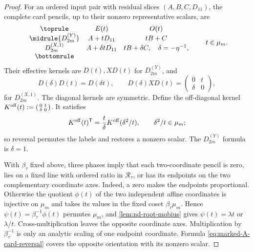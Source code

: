 \documentclass[11pt,letterpaper,onecolumn]{article}
\theoremstyle{plain}
\theoremstyle{definition}
\theoremstyle{remark}
\newcommand{\DihY}[1]{{D_{#1}^{(Y)}}}
\newcommand{\DihXone}[1]{{D_{#1}^{(X,1)}}}
\begin{document}
\begin{proof}
For an ordered input pair with residual slices \((A,B,C,D_{11})\), the complete
card pencils, up to their nonzero representative scalars, are
\begin{equation*}
\begin{array}{ccc}
\toprule
 &E(t)&O(t)\\ \midrule
 \DihY{2m}&A+tD_{11}&tB+C\\
 \DihXone{2m}&A+\delta tD_{11}&tB+\delta C,
 \quad \delta=-\eta^{-1},\\
\bottomrule
\end{array}
\qquad t\in\mu_m.
\end{equation*}
Their effective kernels are \(D(t),XD(t)\) for \(\DihY{2m}\), and
\[
 D(\delta)D(t)=D(\delta t),
 \qquad
 D(\delta)XD(t)=\begin{pmatrix}0&t\\ \delta&0\end{pmatrix},
\]
for \(\DihXone{2m}\).  The diagonal kernels are symmetric.  Define the
off-diagonal kernel
\(K^{\rm off}(t):=\left(\begin{smallmatrix}0&t\\\delta&0\end{smallmatrix}\right)\).
It satisfies
\begin{equation}
 K^{\rm off}(t)^{\mathsf T}
 =\frac{t}{\delta}K^{\rm off}(\delta^2/t),
 \qquad \delta^2/t\in\mu_m;
 \label{eq:marked-A-card-reversal}
\end{equation}
so reversal permutes the labels and restores a nonzero scalar. The
\(\DihY{2m}\) formula is \(\delta=1\).

With \(\beta_\tau\) fixed above, three
phases imply that
each two-coordinate pencil is zero, lies on a fixed line with ordered
ratio in \(\mathscr R_\tau\), or has its endpoints on the two
complementary coordinate axes.  Indeed, a zero makes the endpoints
proportional.  Otherwise the quotient \(\phi(t)\) of the two independent
affine coordinates is injective on \(\mu_m\) and takes its values in the
fixed coset \(\beta_\tau\mu_m\).  Hence
\(\psi(t)=\beta_\tau^{-1}\phi(t)\) permutes \(\mu_m\), and
\cref{lem:nd-root-mobius} gives
\(\psi(t)=\lambda t\) or \(\lambda/t\).  Cross-multiplication leaves the
opposite coordinate axes.  Multiplication by \(\beta_\tau^{-1}\) is only an
analytic scaling of one endpoint coordinate.   Formula \cref{eq:marked-A-card-reversal} covers the opposite
orientation with its nonzero scalar.


\end{proof}
\end{document}
